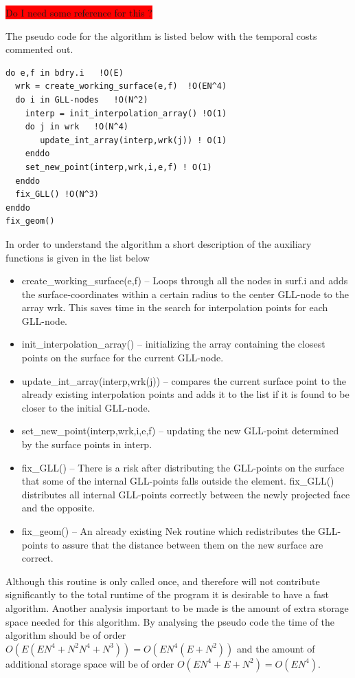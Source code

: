 \colorbox{red}{Do I need some reference for this ?}

The pseudo code for the algorithm is listed below with the temporal costs commented out.
%
\begingroup
\fontsize{12pt}{14pt}
\begin{lstlisting}[escapechar=|,frame=none]
do e,f in bdry.i   !O(E)
  wrk = create_working_surface(e,f)  !O(EN^4) 
  do i in GLL-nodes   !O(N^2)
    interp = init_interpolation_array() !O(1) 
    do j in wrk   !O(N^4)
       update_int_array(interp,wrk(j)) ! O(1)
    enddo
    set_new_point(interp,wrk,i,e,f) ! O(1)
  enddo
  fix_GLL() !O(N^3)
enddo
fix_geom()
\end{lstlisting}
\endgroup
% 
In order to understand the algorithm a short description of the auxiliary functions is 
given in the list below
\begin{itemize}
    \item create\_working\_surface(e,f) -- Loops through all the nodes in surf.i and adds the 
        surface-coordinates within a certain radius to the center GLL-node to the array wrk.
        This saves time in the search for interpolation points for each GLL-node.
    \item init\_interpolation\_array() -- initializing the array containing the closest 
        points on the surface for the current GLL-node. 
    \item update\_int\_array(interp,wrk(j)) -- compares the current surface point to the 
        already existing interpolation points and adds it to the list if it is found to 
        be closer to the initial GLL-node.
    \item set\_new\_point(interp,wrk,i,e,f) -- updating the new GLL-point determined by the 
        surface points in interp.
    \item fix\_GLL() -- There is a risk after distributing the GLL-points on the surface that
        some of the internal GLL-points falls outside the element. fix\_GLL() distributes 
        all internal GLL-points correctly between the newly projected face and the opposite.
    \item fix\_geom() -- An already existing Nek routine which redistributes the GLL-points to 
        assure that the distance between them on the new surface are correct.
\end{itemize}

Although this routine is only called once, and therefore will not contribute significantly 
to the total runtime of the program it is desirable to have a fast algorithm. Another analysis
important to be made is the amount of extra storage space needed for this algorithm.
By analysing the pseudo code the time of the algorithm should be of order $O(E(EN^4+N^2N^4+N^3))=O(EN^4(E+N^2))$
and the amount of additional storage space will be of order $O(EN^4+E+N^2)=O(EN^4)$.

